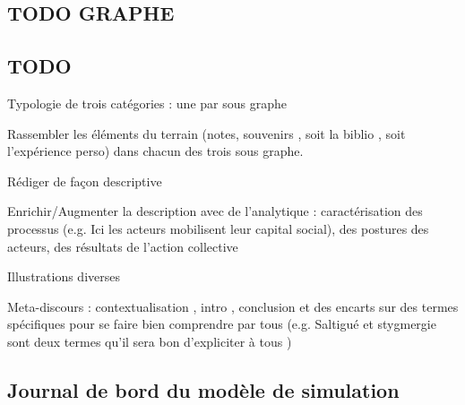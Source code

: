 \subsection{TODO GRAPHE}

\subsection{ TODO }

Typologie de trois catégories : une par sous graphe 

Rassembler les éléments du terrain (notes, souvenirs , soit la biblio , soit l'expérience perso) dans chacun des trois sous graphe.

Rédiger de façon descriptive

Enrichir/Augmenter la description avec de l'analytique  : caractérisation des processus (e.g. Ici les acteurs mobilisent leur capital social), des postures des acteurs, des résultats de l'action collective 


Illustrations diverses

Meta-discours : contextualisation , intro , conclusion et des encarts sur des termes spécifiques pour se faire bien comprendre par tous (e.g. Saltigué et stygmergie sont deux termes qu'il sera bon d'expliciter à tous )






\subsection{Journal de bord du modèle de simulation}


